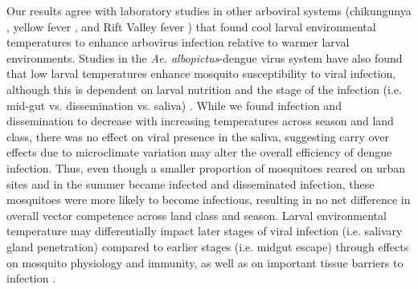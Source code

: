 \documentclass[12pt]{article}
\begin{document}
Our results agree with laboratory studies in other arboviral systems (chikungunya \cite{adelman2013}, yellow fever \cite{adelman2013}, and Rift Valley fever \cite{turell1993}) that found cool larval environmental temperatures to enhance arbovirus infection relative to warmer larval environments.
Studies in the \textit{Ae. albopictus}-dengue virus system have also found that low larval temperatures enhance mosquito susceptibility to viral infection, although this is dependent on larval nutrition \cite{buckner2016} and the stage of the infection (i.e. mid-gut vs. dissemination vs. saliva) \cite{alto2013}.
While we found infection and dissemination to decrease with increasing temperatures across season and land class, there was no effect on viral presence in the saliva, suggesting carry over effects due to microclimate variation may alter the overall efficiency of dengue infection.
Thus, even though a smaller proportion of mosquitoes reared on urban sites and in the summer became infected and disseminated infection, these mosquitoes were more likely to become infectious, resulting in no net difference in overall vector competence across land class and season.
Larval environmental temperature may differentially impact later stages of viral infection (i.e. salivary gland penetration) compared to earlier stages (i.e. midgut escape) through effects on mosquito physiology and immunity, as well as on important tissue barriers to infection \cite{murdock2012,adelman2013,franz2015,houk1979}.
\end{document}

